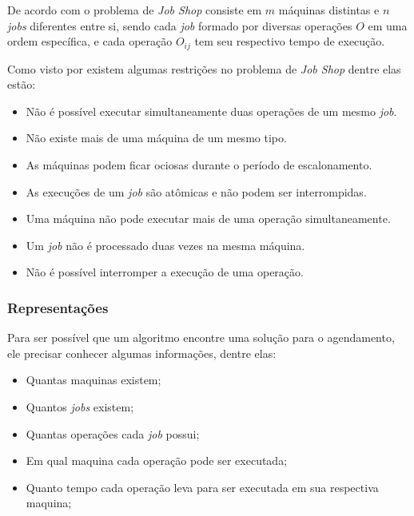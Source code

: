             De acordo com \cite{Cheng1996} o problema de \textit{Job Shop} consiste em $m$ máquinas distintas e $n$ \textit{jobs} diferentes entre si, sendo cada \textit{job} formado por diversas operações $O$ em uma ordem específica, e cada operação $O_{ij}$ tem seu respectivo tempo de execução.\hfill\vspace{\onelineskip}

            \noindent Como visto por \cite{Bagchi1999} existem algumas restrições no problema de \textit{Job Shop} dentre elas estão:
            \begin{itemize}
                \item Não é possível executar simultaneamente duas operações de um mesmo \textit{job}.
                \item Não existe mais de uma máquina de um mesmo tipo.
                \item As máquinas podem ficar ociosas durante o período de escalonamento.
                \item As execuções de um \textit{job} são atômicas e não podem ser interrompidas.
                \item Uma máquina não pode executar mais de uma operação simultaneamente.
                \item Um \textit{job} não é processado duas vezes na mesma máquina.
                \item Não é possível interromper a execução de uma operação.
            \end{itemize}\hfill\vspace{\onelineskip}\vspace{\onelineskip}
        
        \subsubsection{Representações}
            Para ser possível que um algoritmo encontre uma solução para o agendamento, ele precisar conhecer algumas informações, dentre elas: 
            \begin{itemize}
                \item Quantas maquinas existem;
                \item Quantos \textit{jobs} existem;
                \item Quantas operações cada \textit{job} possui;
                \item Em qual maquina cada operação pode ser executada;
                \item Quanto tempo cada operação leva para ser executada em sua respectiva maquina;
            \end{itemize}


